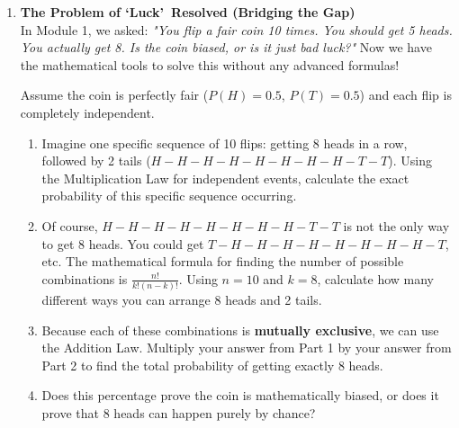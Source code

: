 \begin{enumerate}[label=\textbf{Q\arabic*.}, leftmargin=*, start=3]
    \item \textbf{The Problem of \lq Luck\rq\ Resolved (Bridging the Gap)} \\
    In Module 1, we asked: \textit{"You flip a fair coin 10 times. You should get 5 heads. You actually get 8. Is the coin biased, or is it just bad luck?"} Now we have the mathematical tools to solve this without any advanced formulas!
    
    Assume the coin is perfectly fair ($P(H) = 0.5$, $P(T) = 0.5$) and each flip is completely independent.
    \begin{enumerate}[label=\arabic*.]
        \item Imagine one specific sequence of 10 flips: getting 8 heads in a row, followed by 2 tails ($H-H-H-H-H-H-H-H-T-T$). Using the Multiplication Law for independent events, calculate the exact probability of this specific sequence occurring.
        \item Of course, $H-H-H-H-H-H-H-H-T-T$ is not the only way to get 8 heads. You could get $T-H-H-H-H-H-H-H-H-T$, etc. The mathematical formula for finding the number of possible combinations is $\frac{n!}{k!(n-k)!}$. Using $n=10$ and $k=8$, calculate how many different ways you can arrange 8 heads and 2 tails.
        \item Because each of these combinations is \textbf{mutually exclusive}, we can use the Addition Law. Multiply your answer from Part 1 by your answer from Part 2 to find the total probability of getting exactly 8 heads.
        \item Does this percentage prove the coin is mathematically biased, or does it prove that 8 heads can happen purely by chance? 
    \end{enumerate}

\end{enumerate}